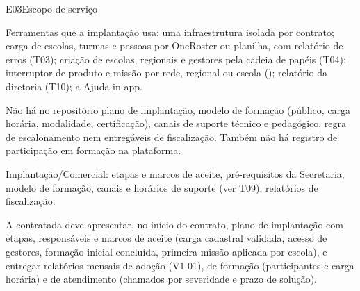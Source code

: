 \begin{resposta}{E03}{Escopo de serviço}{\foradorepo}
\begin{campos}
  \item[Plataforma] Ferramentas que a implantação usa: uma infraestrutura
    isolada por contrato; carga de escolas, turmas e pessoas por OneRoster ou
    planilha, com relatório de erros (T03); criação de escolas, regionais e
    gestores pela cadeia de papéis (T04); interruptor de produto e missão por
    rede, regional ou escola (); relatório da diretoria (T10); a
    Ajuda in-app.
  \item[Limitações] Não há no repositório plano de implantação, modelo de
    formação (público, carga horária, modalidade, certificação), canais de
    suporte técnico e pedagógico, regra de escalonamento nem entregáveis de
    fiscalização. Também não há registro de participação em formação na
    plataforma.
  \item[Lacuna] Implantação/Comercial: etapas e marcos de aceite, pré-requisitos
    da Secretaria, modelo de formação, canais e horários de suporte (ver
    T09), relatórios de fiscalização.
\end{campos}
\end{resposta}

\begin{paraotr}
A contratada deve apresentar, no início do contrato, plano de implantação com
etapas, responsáveis e marcos de aceite (carga cadastral validada, acesso de
gestores, formação inicial concluída, primeira missão aplicada por escola), e
entregar relatórios mensais de adoção (V1-01), de formação (participantes e
carga horária) e de atendimento (chamados por severidade e prazo de solução).
\end{paraotr}
